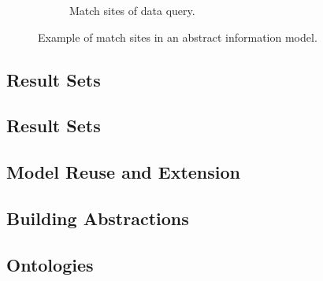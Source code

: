 \begin{figure}[tbp]
\begin{subfigure}[b]{0.48\textwidth}
{{
      }
    }
    \caption{Match sites of data query.}
    \label{fig:topics:info:match:data}
  \end{subfigure}
  
  \caption[Example of match sites in an abstract information model]{Example of match sites in an abstract information model.}
  \label{fig:topics:info:match}
\end{figure}

\subsection{Result Sets}



\subsection{Result Sets}

\subsection{Model Reuse and Extension}



\subsection{Building Abstractions}



\subsection{Ontologies}
